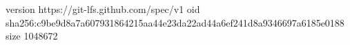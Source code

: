 version https://git-lfs.github.com/spec/v1
oid sha256:c9be9d8a7a607931864215aa44e23da22ad44a6ef241d8a9346697a6185e0188
size 1048672
